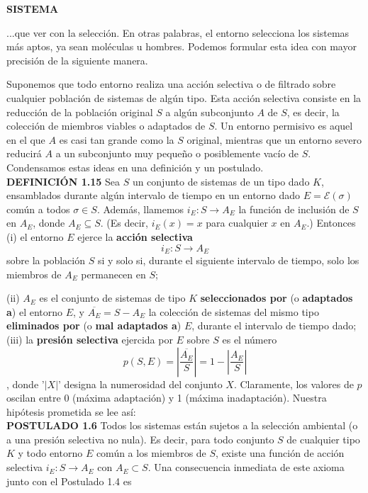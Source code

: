 \newpage
\fancyhf{}
\fancyhead[r]{\thepage}
\begin{center}
{\fontsize{13}{16}\selectfont \textbf{SISTEMA}}
\end{center}
\vspace{0.5cm}

{\fontsize{13}{15}\selectfont
...que ver con la selección. En otras palabras, el entorno selecciona los sistemas más aptos, ya sean moléculas u hombres. Podemos formular esta idea con mayor precisión de la siguiente manera. \par

Suponemos que todo entorno realiza una acción selectiva o de filtrado sobre cualquier población de sistemas de algún tipo. Esta acción selectiva consiste en la reducción de la población original \( S \) a 
algún subconjunto \( A \) de \( S \), es decir, la colección de miembros viables o adaptados de \( S \). Un entorno permisivo es aquel en el que \( A \) es casi tan grande como la \( S \) original, mientras que un entorno severo reducirá \( A \) a un subconjunto muy pequeño o posiblemente vacío de \( S \). Condensamos estas ideas en una definición y un postulado.\\


\textbf{DEFINICIÓN 1.15} Sea \( S \) un conjunto de sistemas de un tipo dado \( K \), ensamblados durante algún intervalo de tiempo en un entorno dado \( E = \mathcal{E}(\sigma) \) común a todos \( \sigma \in S \). Además, llamemos \( i_E : S \rightarrow A_E \) la función de inclusión de \( S \) en \( A_E \), 
donde \( A_E \subseteq S \). (Es decir, \( i_E(x) = x \) para cualquier \( x \) en \( A_E \).) Entonces (i) el entorno \( E \) ejerce la \textbf{acción selectiva} \[ i_E : S \rightarrow A_E \] sobre la población \( S \) si y solo si, durante el siguiente intervalo de tiempo, solo los miembros de \( A_E \) permanecen en \( S \); \par 
(ii) \( A_E \) es el conjunto de sistemas de tipo \( K \) \textbf{seleccionados por} (o \textbf{adaptados a}) el entorno \( E \), y \( \overline{A_E} = S - A_E \) la colección de sistemas del mismo tipo \textbf{eliminados por} (o \textbf{mal adaptados a}) \( E \), 
durante el intervalo de tiempo dado; (iii) la \textbf{presión selectiva} ejercida por \( E \) sobre \( S \) es el número \[ p(S, E) = \left| \frac{\overline{A_E}}{S} \right| = 1 - \left| \frac{A_E}{S} \right| \], donde '\( |X| \)' designa la numerosidad del conjunto \( X \). Claramente, los valores de \( p \) oscilan entre 0 (máxima adaptación) y 1 (máxima inadaptación). 
Nuestra hipótesis prometida se lee así: \\

\textbf{POSTULADO 1.6} Todos los sistemas están sujetos a la selección ambiental (o a una presión selectiva no nula). Es decir, para todo conjunto \( S \) de cualquier tipo \( K \) y todo entorno \( E \) común a los miembros de \( S \), existe una función de acción selectiva \( i_E : S \rightarrow A_E \) con \( A_E \subset S \). Una consecuencia inmediata de este axioma junto con el Postulado 1.4 es
}

